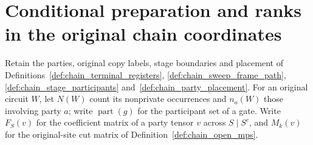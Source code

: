 \section{Conditional preparation and ranks in the original chain coordinates}

Retain the parties, original copy labels, stage boundaries and placement of
Definitions~\ref{def:chain_terminal_registers},
\ref{def:chain_sweep_frame_path}, \ref{def:chain_stage_participants}
and~\ref{def:chain_party_placement}.
For an original circuit $W$, let $N(W)$ count its nonprivate occurrences
and $n_a(W)$ those involving party $a$; write $\operatorname{part}(g)$
for the participant set of a gate.
Write $F_S(v)$ for the coefficient matrix of a party tensor $v$ across
$S\mid S^c$, and $M_k(v)$ for the original-site cut matrix of
Definition~\ref{def:chain_open_mps}.

